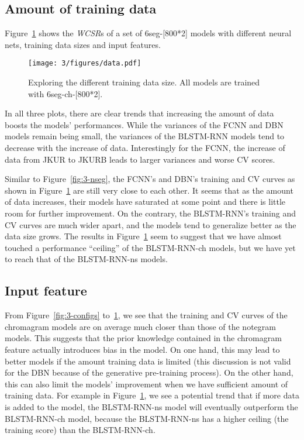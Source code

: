 \subsection{Amount of training data}\label{sec:3-p5}
Figure~\ref{fig:3-data} shows the \textit{WCSR}s of a set of 6seg-[800*2] models with different neural nets, training data sizes and input features.
\begin{figure}[h!]
	\centering
	\texttt{[image: 3/figures/data.pdf]}
	\caption{Exploring the different training data size. All models are trained with 6seg-ch-[800*2].}
	\label{fig:3-data}
\end{figure}

In all three plots, there are clear trends that increasing the amount of data boosts the models' performances. While the variances of the FCNN and DBN models remain being small, the variances of the BLSTM-RNN models tend to decrease with the increase of data. Interestingly for the FCNN, the increase of data from JKUR to JKURB leads to larger variances and worse CV scores.

Similar to Figure~\ref{fig:3-nseg}, the FCNN's and DBN's training and CV curves as shown in Figure~\ref{fig:3-data} are still very close to each other. It seems that as the amount of data increases, their models have saturated at some point and there is little room for further improvement. On the contrary, the BLSTM-RNN's training and CV curves are much wider apart, and the models tend to generalize better as the data size grows. The results in Figure~\ref{fig:3-data} seem to suggest that we have almost touched a performance ``ceiling'' of the BLSTM-RNN-ch models, but we have yet to reach that of the BLSTM-RNN-ns models.

\subsection{Input feature}\label{sec:3-p6}
From Figure~\ref{fig:3-configs} to~\ref{fig:3-data}, we see that the training and CV curves of the chromagram models are on average much closer than those of the notegram models. This suggests that the prior knowledge contained in the chromagram feature actually introduces bias in the model. On one hand, this may lead to better models if the amount training data is limited (this discussion is not valid for the DBN because of the generative pre-training process). On the other hand, this can also limit the models' improvement when we have sufficient amount of training data. For example in Figure~\ref{fig:3-data}, we see a potential trend that if more data is added to the model, the BLSTM-RNN-ns model will eventually outperform the BLSTM-RNN-ch model, because the BLSTM-RNN-ns has a higher ceiling (the training score) than the BLSTM-RNN-ch.

